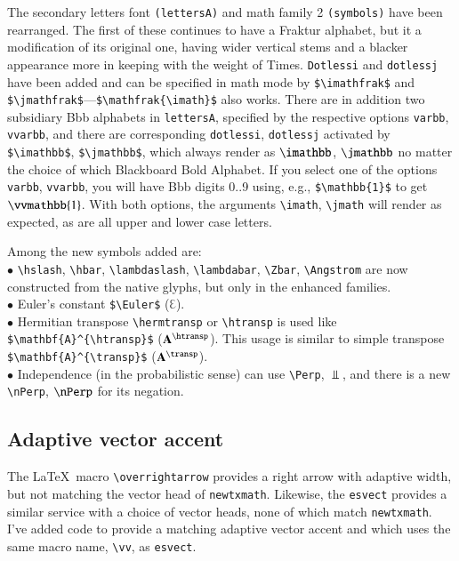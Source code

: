 \documentclass[\fsc]{article}
\theoremstyle{oldplain}
\theoremstyle{plain}
\begin{document}
The secondary letters font {\tt (lettersA)} and math family 2 {\tt(symbols)} have been rearranged. The first of these continues to have a Fraktur alphabet, but it a modification of its original one, having wider vertical stems and a blacker appearance more in keeping with the weight of Times. {\tt Dotlessi} and {\tt dotlessj} have been added and can be specified in math mode by \verb|$\imathfrak$| and \verb|$\jmathfrak$|---\verb|$\mathfrak{\imath}$| also works. There are in addition two subsidiary Bbb alphabets in {\tt lettersA}, specified by the respective options {\tt varbb}, {\tt vvarbb}, and there are corresponding {\tt dotlessi}, {\tt dotlessj} activated by \verb|$\imathbb$|, \verb|$\jmathbb$|, which always render as $\imathbb$, $\jmathbb$ no matter the choice of which Blackboard Bold Alphabet. If you select one of the options {\tt varbb}, {\tt vvarbb}, you will have Bbb digits 0..9 using, e.g., \verb|$\mathbb{1}$| to get~$\vvmathbb{1}$. With both options, the arguments \verb|\imath|, \verb|\jmath| will render as expected, as are all upper and lower case letters.


Among the new symbols added are:\\
$\bullet$ \verb|\hslash|, \verb|\hbar|, \verb|\lambdaslash|, \verb|\lambdabar|, \verb|\Zbar|, \verb|\Angstrom| are now constructed from the native glyphs, but only in the enhanced families.\\
$\bullet$ Euler's constant \verb|$\Euler$| ($\Euler$).\\
$\bullet$ Hermitian transpose \verb|\hermtransp| or \verb|\htransp| is used like \verb|$\mathbf{A}^{\htransp}$| ($\mathbf{A}^{\htransp}$). This usage is similar to simple transpose \verb|$\mathbf{A}^{\transp}$| ($\mathbf{A}^{\transp}$).\\
$\bullet$ Independence (in the probabilistic sense) can use \verb|\Perp|, $\Perp$, and there is a new \verb|\nPerp|, $\nPerp$ for its negation.

\subsection{Adaptive vector accent} The \LaTeX\ macro \verb|\overrightarrow| provides a right arrow with adaptive width, but not matching the vector head of {\tt newtxmath}. Likewise, the {\tt esvect} provides a similar service with a choice of vector heads, none of which match {\tt newtxmath}. I've added code to provide a matching adaptive vector accent and which uses the same macro name, \verb|\vv|, as {\tt esvect}.
\end{document}
